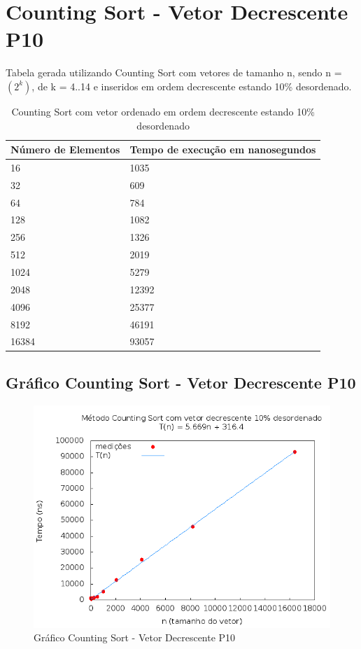 \documentclass[12pt,a4paper,twoside]{report}
\begin{document}
\section{Counting Sort - Vetor Decrescente P10}
Tabela gerada utilizando Counting Sort com vetores de tamanho n, sendo n = $(2^k)$, de k = 4..14 e inseridos em ordem decrescente estando 10\% desordenado.
\begin{table}[H]
\centering
\caption{Counting Sort com vetor ordenado em ordem decrescente estando 10\% desordenado}
\label{my-label}
\begin{tabular}{|l|l|}
\hline
\multicolumn{1}{|c|}{\textbf{Número de Elementos}} & \multicolumn{1}{c|}{\textbf{Tempo de execução em nanosegundos}} \\ \hline
16 & 1035 \\ \hline
32 & 609 \\ \hline
64 & 784 \\ \hline
128 & 1082 \\ \hline
256 & 1326 \\ \hline
512 & 2019 \\ \hline
1024 & 5279 \\ \hline
2048 & 12392 \\ \hline
4096 & 25377 \\ \hline
8192 & 46191 \\ \hline
16384 & 93057 \\ \hline
\end{tabular}
\end{table}

\subsection{Gráfico Counting Sort - Vetor Decrescente P10}
\begin{figure}[H]
    \centering
    \includegraphics[width=0.7\linewidth]{graficos/CountingSort/vIntDecrescenteP10/vIntDecrescenteP10.png}
  \caption{Gráfico Counting Sort - Vetor Decrescente P10}
\end{figure}
\end{document}
